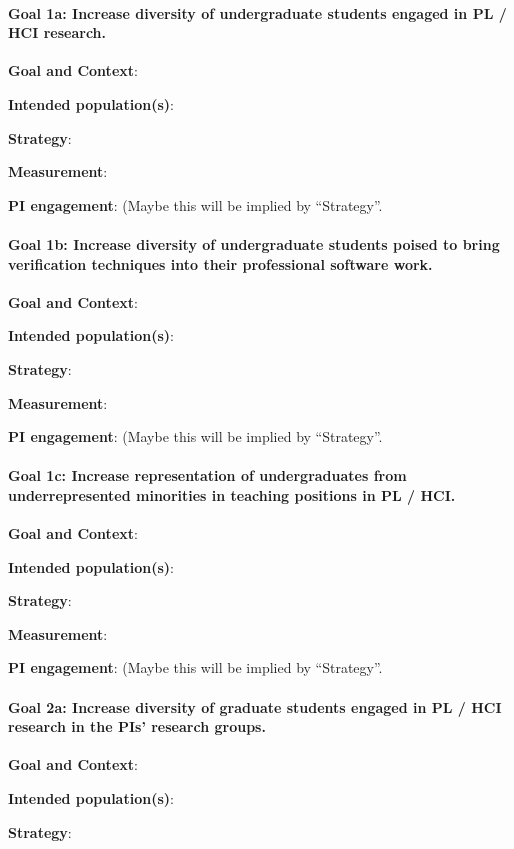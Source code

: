 \paragraph*{Goal 1a: Increase diversity of undergraduate students engaged in PL
/ HCI research.}

\textbf{Goal and Context}:

\textbf{Intended population(s)}:

\textbf{Strategy}:

\textbf{Measurement}:

\textbf{PI engagement}: (Maybe this will be implied by ``Strategy''.

\paragraph*{Goal 1b: Increase diversity of undergraduate students poised to
bring verification techniques into their professional software work.}

\textbf{Goal and Context}:

\textbf{Intended population(s)}:

\textbf{Strategy}:

\textbf{Measurement}:

\textbf{PI engagement}: (Maybe this will be implied by ``Strategy''.

\paragraph*{Goal 1c: Increase representation of undergraduates from
underrepresented minorities in teaching positions in PL / HCI.}

\textbf{Goal and Context}:

\textbf{Intended population(s)}:

\textbf{Strategy}:

\textbf{Measurement}:

\textbf{PI engagement}: (Maybe this will be implied by ``Strategy''.

\paragraph*{Goal 2a: Increase diversity of graduate students engaged in PL / HCI
research in the PIs' research groups.}

\textbf{Goal and Context}:

\textbf{Intended population(s)}:

\textbf{Strategy}:


